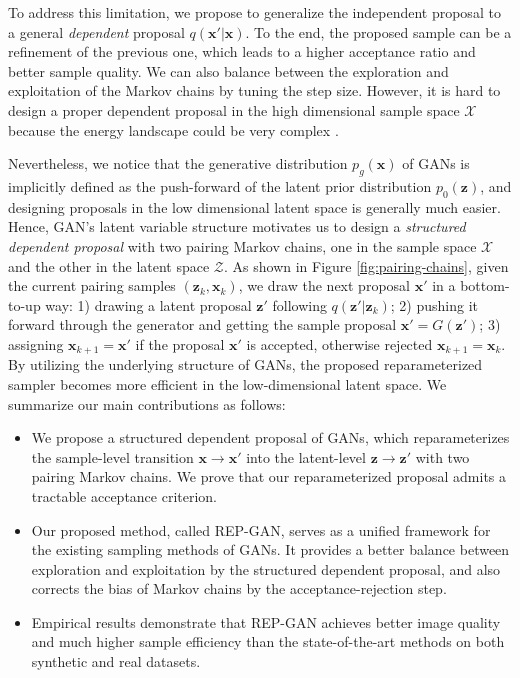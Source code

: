 \documentclass[runningheads]{llncs}
\newcommand{\bx}{\mathbf{x}}
\newcommand{\bz}{\mathbf{z}}
\newcommand{\cX}{\mathcal{X}}
\newcommand{\cZ}{\mathcal{Z}}
\newcommand{\<}{\left\langle}
\renewcommand{\>}{\right\rangle}
\begin{document}
To address this limitation, we propose to generalize the independent proposal to a general \emph{dependent} proposal $q(\bx'|\bx)$. To the end, the proposed sample can be a refinement of the previous one, which leads to a higher acceptance ratio and better sample quality. We can also balance between the exploration and exploitation of the Markov chains by tuning the step size. However, it is hard to design a proper dependent proposal in the high dimensional sample space $\cX$ because the energy landscape could be very complex \cite{neal2010MCMC}. 

Nevertheless, we notice that the generative distribution $p_g(\bx)$ of GANs is implicitly defined as the push-forward of the latent prior distribution $p_0(\bz)$, and designing proposals in the low dimensional latent space is generally much easier. Hence, GAN's latent variable structure motivates us to design a \emph{structured dependent proposal} with two pairing Markov chains, one in the sample space $\cX$ and the other in the latent space $\cZ$. As shown in Figure \ref{fig:pairing-chains}, given the current pairing samples $(\bz_k,\bx_k)$, we draw the next proposal $\bx'$ in a bottom-to-up way: 1) drawing a latent proposal $\bz'$ following $q(\bz'|\bz_k)$; 2) pushing it forward through the generator and getting the sample proposal $\bx'=G(\bz')$; 3) assigning $\bx_{k+1}=\bx'$ if the proposal $\bx'$ is accepted, otherwise rejected $\bx_{k+1}=\bx_k$. By utilizing the underlying structure of GANs, the proposed reparameterized sampler becomes more efficient in the low-dimensional latent space. 
We summarize our main contributions as follows:
\begin{itemize}
    \item We propose a structured dependent proposal of GANs, which reparameterizes the sample-level transition $\bx\to\bx'$ into the latent-level  $\bz\to\bz'$ with two pairing Markov chains. We prove that our reparameterized proposal admits
    a tractable acceptance criterion.
    \item Our proposed method, called REP-GAN, serves as a unified framework for the existing sampling methods of GANs. It provides a better balance between exploration and exploitation by the structured dependent proposal, and also corrects the bias of Markov chains by the acceptance-rejection step. 
    \item Empirical results demonstrate that REP-GAN achieves better image quality and much higher sample efficiency than the state-of-the-art methods on both synthetic and real datasets. 
\end{itemize}
\end{document}
